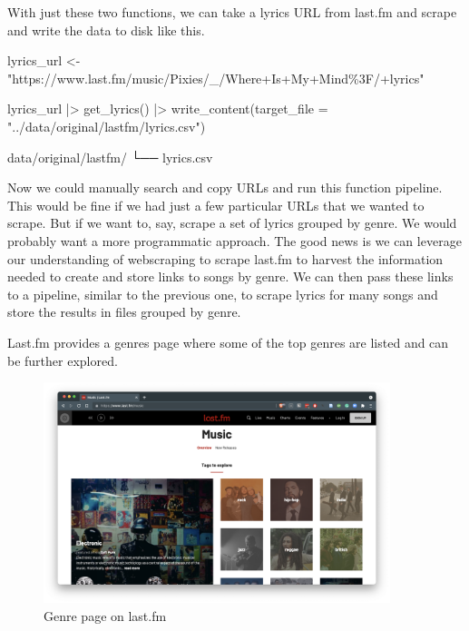 \documentclass[
  letterpaper,
]{latex/krantz}
\newenvironment{Shaded}{\begin{snugshade}}{\end{snugshade}}
\newcommand{\AttributeTok}[1]{\textcolor[rgb]{0.40,0.45,0.13}{#1}}
\newcommand{\ExtensionTok}[1]{\textcolor[rgb]{0.00,0.23,0.31}{#1}}
\newcommand{\FunctionTok}[1]{\textcolor[rgb]{0.28,0.35,0.67}{#1}}
\newcommand{\NormalTok}[1]{\textcolor[rgb]{0.00,0.23,0.31}{#1}}
\newcommand{\OtherTok}[1]{\textcolor[rgb]{0.00,0.23,0.31}{#1}}
\newcommand{\SpecialCharTok}[1]{\textcolor[rgb]{0.37,0.37,0.37}{#1}}
\newcommand{\StringTok}[1]{\textcolor[rgb]{0.13,0.47,0.30}{#1}}
\begin{document}
With just these two functions, we can take a lyrics URL from last.fm and
scrape and write the data to disk like this.

\begin{Shaded}
\begin{Highlighting}[]
\NormalTok{lyrics\_url }\OtherTok{\textless{}{-}} \StringTok{"https://www.last.fm/music/Pixies/\_/Where+Is+My+Mind\%3F/+lyrics"}

\NormalTok{lyrics\_url }\SpecialCharTok{|\textgreater{}} 
  \FunctionTok{get\_lyrics}\NormalTok{() }\SpecialCharTok{|\textgreater{}} 
  \FunctionTok{write\_content}\NormalTok{(}\AttributeTok{target\_file =} \StringTok{"../data/original/lastfm/lyrics.csv"}\NormalTok{)}
\end{Highlighting}
\end{Shaded}

\begin{Shaded}
\begin{Highlighting}[]
\ExtensionTok{data/original/lastfm/}
\ExtensionTok{└──}\NormalTok{ lyrics.csv}
\end{Highlighting}
\end{Shaded}

Now we could manually search and copy URLs and run this function
pipeline. This would be fine if we had just a few particular URLs that
we wanted to scrape. But if we want to, say, scrape a set of lyrics
grouped by genre. We would probably want a more programmatic approach.
The good news is we can leverage our understanding of webscraping to
scrape last.fm to harvest the information needed to create and store
links to songs by genre. We can then pass these links to a pipeline,
similar to the previous one, to scrape lyrics for many songs and store
the results in files grouped by genre.

Last.fm provides a genres page where some of the top genres are listed
and can be further explored.

\begin{figure}[h]

{\centering \includegraphics[width=0.9\textwidth,height=\textheight]{./figures/acquire-data/ad-lastfm-genres.png}

}

\caption{\label{fig-ad-genre-page-lastfm}Genre page on last.fm}

\end{figure}
\end{document}
